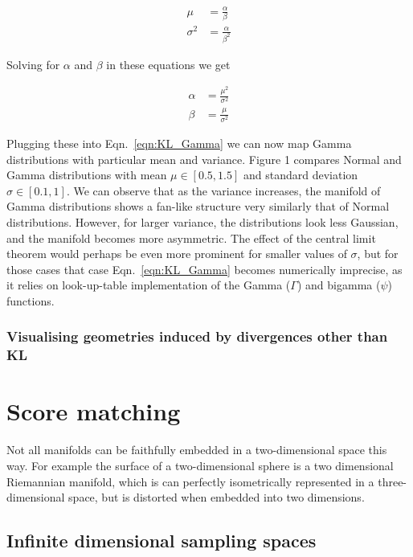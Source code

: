 \begin{align}
	\mu &= \frac{\alpha}{\beta}\\
	\sigma^2 &= \frac{\alpha}{\beta^2}
\end{align}

Solving for $\alpha$ and $\beta$ in these equations we get

\begin{align}
	\alpha &= \frac{\mu^2}{\sigma^2}\\
	\beta &= \frac{\mu}{\sigma^2}
\end{align}

Plugging these into Eqn.\ \eqref{eqn:KL_Gamma} we can now map Gamma distributions with particular mean and variance. Figure 1 compares Normal and Gamma distributions with mean $\mu\in[0.5,1.5]$ and standard deviation $\sigma\in[0.1,1]$. We can observe that as the variance increases, the manifold of Gamma distributions shows a fan-like structure very similarly that of Normal distributions. However, for larger variance, the distributions look less Gaussian, and the manifold becomes more asymmetric. The effect of the central limit theorem would perhaps be even more prominent for smaller values of $\sigma$, but for those cases that case Eqn.\ \eqref{eqn:KL_Gamma} becomes numerically imprecise, as it relies on look-up-table implementation of the Gamma ($\Gamma$) and bigamma ($\psi$) functions.

\subsection{Visualising geometries induced by divergences other than KL}





\chapter[score matching]{Score matching}

Not all manifolds can be faithfully embedded in a two-dimensional space this way. For example the surface of a two-dimensional sphere is a two dimensional Riemannian manifold, which is can perfectly isometrically represented in a three-dimensional space, but is distorted when embedded into two dimensions.


\section{Infinite dimensional sampling spaces}

